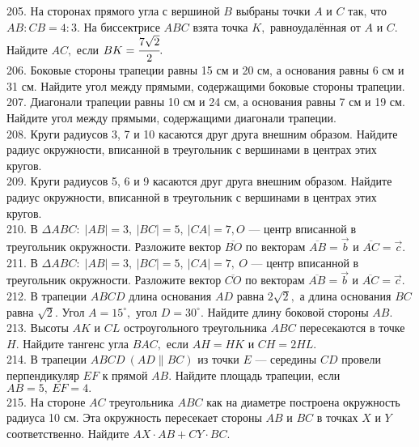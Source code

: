 205. На сторонах прямого угла с вершиной $B$ выбраны точки $A$ и $C$ так, что $AB : CB = 4 : 3.$ На
биссектрисе $ABC$ взята точка $K,$ равноудалённая от $A$ и $C.$ Найдите $AC,$ если $BK =\cfrac{7\sqrt{2}}{2}.$\\
206. Боковые стороны трапеции равны 15 см и 20 см, а основания равны 6 см и 31 см. Найдите угол между прямыми, содержащими боковые стороны трапеции.\\
207. Диагонали трапеции равны 10 см и 24 см, а основания равны 7 см и 19 см. Найдите угол между прямыми, содержащими диагонали трапеции.\\
208. Круги радиусов 3, 7 и 10 касаются друг друга внешним образом. Найдите радиус окружности, вписанной в треугольник с вершинами в центрах этих кругов.\\
209. Круги радиусов 5, 6 и 9 касаются друг друга внешним образом. Найдите радиус окружности, вписанной в треугольник с вершинами в центрах этих кругов.\\
210. В $\Delta ABC:\; |AB| = 3,\ |BC| = 5,\ |CA| = 7, O$ --- центр вписанной в треугольник окружности.
Разложите вектор  $\overline{BO}$ по векторам  $\overline{AB}=\vec{b}$ и  $\overline{AC}=\vec{c}.$\\
211. В $\Delta ABC:\; |AB| = 3,\ |BC| = 5,\ |CA| = 7,\ O$ --- центр вписанной в треугольник окружности. Разложите вектор $\overline{CO}$ по векторам
$\overline{AB}=\vec{b}$ и  $\overline{AC}=\vec{c}.$\\
212. В трапеции  $ABCD$ длина основания  $AD$ равна  $2\sqrt{2},$ а длина основания  $BC$ равна  $\sqrt{2}.$ Угол $A=15^\circ,$
угол $D=30^\circ.$ Найдите длину боковой стороны  $AB.$\\
213. Высоты  $AK$ и  $CL$ остроугольного треугольника  $ABC$ пересекаются в точке  $H.$ Найдите тангенс угла
$BAC,$ если  $AH=HK$ и  $CH=2HL.$\\
214. В трапеции  $ABCD\  (AD\parallel BC)$ из точки  $E$ --- середины  $CD$ провели перпендикуляр  $EF$ к прямой  $AB.$
Найдите площадь трапеции, если  $AB=5,\ EF=4.$\\
215. На стороне  $AC$ треугольника  $ABC$ как на диаметре построена окружность радиуса 10 см. Эта
окружность пересекает стороны  $AB$ и  $BC$ в точках  $X$ и  $Y$ соответственно. Найдите  $AX\cdot AB + CY\cdot BC.$
\newpage

